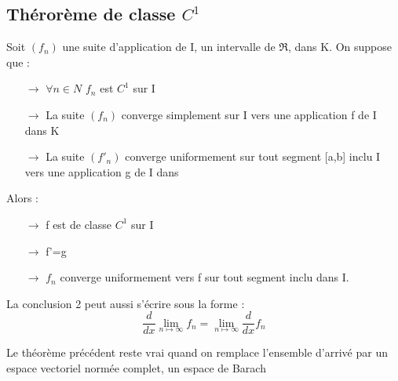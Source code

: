 \subsection{Thérorème de classe $C^1$}
\begin{theo}
Soit $(f_n)$ une suite d'application de I, un intervalle de $\Re$, dans K. On suppose que : \\
\begin{itemize}
 \item[$\rightarrow$] $\forall n \in N$ $f_n$ est $C^1$ sur I\\
 \item[$\rightarrow$] La suite $(f_n)$ converge simplement sur I vers une application f de I dans K\\
 \item[$\rightarrow$] La suite $(f'_n)$ converge uniformement sur tout segment [a,b] inclu I vers une application g de I dans \\
\end{itemize}
Alors : \\
\begin{itemize}
 \item[$\rightarrow$] f est de classe $C^1$ sur I\\
 \item[$\rightarrow$] f'=g\\
 \item[$\rightarrow$] $f_n$ converge uniformement vers f sur tout segment inclu dans I.\\
\end{itemize}
La conclusion 2 peut aussi s'écrire sous la forme : 
$$\dfrac{d}{dx} \lim_{n\mapsto\infty} f_n = \lim_{n\mapsto\infty} \dfrac{d}{dx} f_n$$
\end{theo}
\begin{gene}
Le théorème précédent reste vrai quand on remplace l'ensemble d'arrivé par un espace vectoriel normée complet, un espace de Barach  
\end{gene}
